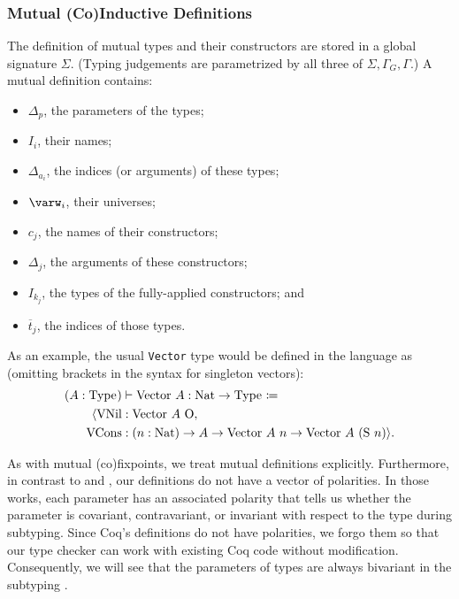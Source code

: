 \documentclass[nonacm,screen,10pt]{acmart}
\begin{document}
\subsubsection{Mutual (Co)Inductive Definitions}



The definition of mutual \coinductive types and their constructors are stored in a global signature $\Sigma$. (Typing judgements are parametrized by all three of $\Sigma, \Gamma_G, \Gamma$.) A mutual \coinductive definition contains:

\begin{itemize}
    \item $\Delta_p$, the parameters of the \coinductive types;
    \item $I_i$, their names;
    \item $\Delta_{a_i}$, the indices (or arguments) of these \coinductive types;
    \item $\varw_i$, their universes;
    \item $c_j$, the names of their constructors;
    \item $\Delta_j$, the arguments of these constructors;
    \item $I_{k_j}$, the \coinductive types of the fully-applied constructors; and
    \item $\overline{t}_j$, the indices of those \coinductive types.
\end{itemize}

As an example, the usual \texttt{Vector} type would be defined in the language as (omitting brackets in the syntax for singleton vectors):
\begin{align*}
    (A : \Type{}) &\vdash \text{Vector}\ A: \text{Nat} \to \Type{} \coloneqq \\
        \langle \text{VNil} &: \text{Vector}\ A\ \text{O}, \\
        \text{VCons} &: (n: \text{Nat}) \to A \to \text{Vector}\ A\ n \to \text{Vector}\ A\ (\text{S}\ n) \rangle.
\end{align*}

As with mutual (co)\-fixpoints, we treat mutual \coinductive definitions explicitly. Furthermore, in contrast to \CIChat and \CIChatbar, our definitions do not have a vector of polarities. In those works, each parameter has an associated polarity that tells us whether the parameter is covariant, contravariant, or invariant with respect to the \coinductive type during subtyping. Since Coq's \coinductive definitions do not have polarities, we forgo them so that our type checker can work with existing Coq code without modification. Consequently, we will see that the parameters of \coinductive types are always bivariant in the subtyping .
\end{document}
